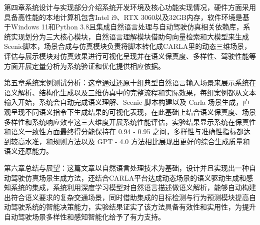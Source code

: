 第四章系统设计与实现部分介绍系统开发环境及核心功能实现情况，硬件方面采用具备高性能的本地计算机包含Intel i9、RTX 3060以及32GB内存，软件环境是基于Windows 11和Python 3.8且集成自然语言处理与自动驾驶仿真相关依赖库，系统实现划分为三大核心模块，自然语言理解模块借助句向量检索和大模型来生成Scenic脚本，场景合成与仿真模块负责将脚本转化成CARLA里的动态三维场景，评估与展示模块对仿真效果进行可视化呈现并在语义保真度、多样性、驾驶性能等方面开展定量分析为系统验证和优化提供相应依据。

第五章系统案例测试分析：这章通过还原十组典型自然语言输入场景来展示系统在语义解析、结构化生成以及三维仿真中的完整流程和实际效果，每组案例都从文本输入开始，系统会自动完成语义理解、Scenic 脚本构建以及 Carla 场景生成，直观呈现不同语义指令下生成结果的可视化表现，在此基础上结合语义保真度、场景多样性和系统响应效率这三大维度开展系统性能评估，实验结果显示系统在保真性和语义一致性方面最终得分能保持在 0.94 - 0.95 之间，多样性与准确性指标都达到较高水准，和规则方法以及 GPT - 4.0 方法相比展现出更好的综合生成质量和语义还原能力。

第六章总结与展望：这篇文章以自然语言处理技术为基础，设计并且实现出一种自动驾驶仿真场景生成方法，还结合CARLA平台达成动态场景的语义驱动生成和感知系统的集成，系统利用深度学习模型对自然语言描述做语义解析，能够自动构建出符合语义要求的复杂交通场景，同时借助集成的目标检测与行为预测模块提高自动驾驶系统的智能决策能力，实验结果证实了该方法具备有效性和实用性，为提升自动驾驶场景多样性和感知智能化给予了有力支持。